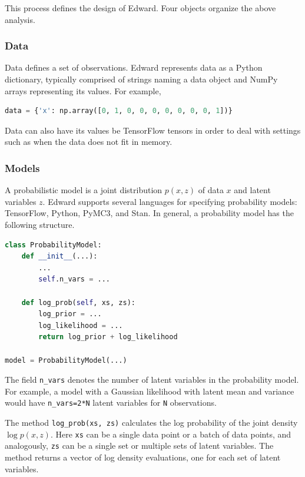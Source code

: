 This process defines the design of Edward. Four objects organize the
above analysis.

\subsubsection{Data}

Data defines a set of observations. Edward represents
data as a Python dictionary, typically comprised of strings naming a
data object and NumPy arrays representing its values. For example,

\begin{lstlisting}[language=Python]
data = {'x': np.array([0, 1, 0, 0, 0, 0, 0, 0, 0, 1])}
\end{lstlisting}

Data can also have its values be TensorFlow tensors in order
to deal with settings such as when the data does not fit in memory.

\subsubsection{Models}\label{models}

A probabilistic model is a joint distribution $p(x, z)$ of data $x$ and latent
variables $z$.
Edward supports several languages for specifying probability models:
TensorFlow, Python, PyMC3, and Stan. In general, a probability model
has the following structure.
\begin{lstlisting}[language=Python]
class ProbabilityModel:
    def __init__(...):
        ...
        self.n_vars = ...

    def log_prob(self, xs, zs):
        log_prior = ...
        log_likelihood = ...
        return log_prior + log_likelihood

model = ProbabilityModel(...)
\end{lstlisting}
The field \texttt{n\_vars} denotes the number of latent variables in the
probability model. For example, a model with a Gaussian likelihood with latent
mean and variance would have \texttt{n\_vars=2*N} latent variables for
\texttt{N} observations.

The method \texttt{log_prob(xs, zs)} calculates the log probability of
the joint density $\log p(x,z)$. Here \texttt{xs} can be a single data
point or a batch of data points, and analogously, \texttt{zs} can be a
single set or multiple sets of latent variables. The method returns a vector
of log density evaluations, one for each set of latent variables.

